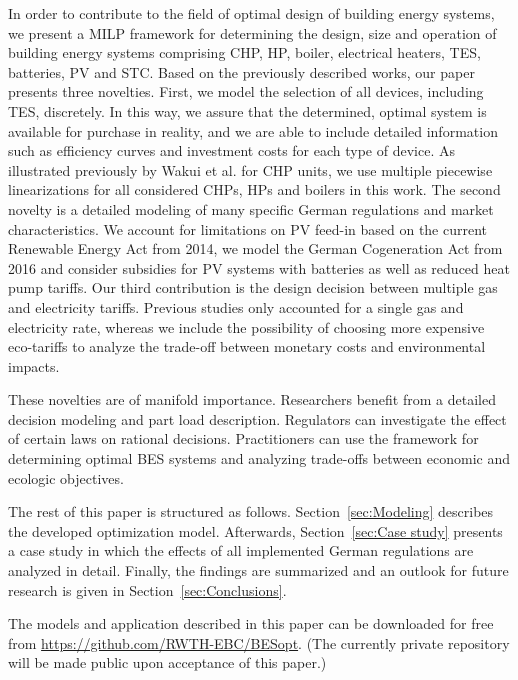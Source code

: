 In order to contribute to the field of optimal design of building energy systems, we present a MILP framework for determining the design, size and operation of building energy systems comprising CHP, HP, boiler, electrical heaters, TES, batteries, PV and STC.
Based on the previously described works, our paper presents three novelties.
First, we model the selection of all devices, including TES, discretely.
In this way, we assure that the determined, optimal system is available for purchase in reality, and we are able to include detailed information such as efficiency curves and investment costs for each type of device.
As illustrated previously by Wakui et al. \cite{Wakui2014,Wakui2016} for CHP units, we use multiple piecewise linearizations for all considered CHPs, HPs and boilers in this work.
The second novelty is a detailed modeling of many specific German regulations and market characteristics.
We account for limitations on PV feed-in based on the current Renewable Energy Act from 2014, we model the German Cogeneration Act from 2016 and consider subsidies for PV systems with batteries as well as reduced heat pump tariffs.
Our third contribution is the design decision between multiple gas and electricity tariffs.
Previous studies only accounted for a single gas and electricity rate, whereas we include the possibility of choosing more expensive eco-tariffs to analyze the trade-off between monetary costs and environmental impacts.

These novelties are of manifold importance.
Researchers benefit from a detailed decision modeling and part load description.
Regulators can investigate the effect of certain laws on rational decisions.
Practitioners can use the framework for determining optimal BES systems and analyzing trade-offs between economic and ecologic objectives.

The rest of this paper is structured as follows.
Section~\ref{sec:Modeling} describes the developed optimization model.
Afterwards, Section~\ref{sec:Case study} presents a case study in which the effects of all implemented German regulations are analyzed in detail.
Finally, the findings are summarized and an outlook for future research is given in Section~\ref{sec:Conclusions}.

The models and application described in this paper can be downloaded for free from \url{https://github.com/RWTH-EBC/BESopt}. (The currently private repository will be made public upon acceptance of this paper.)